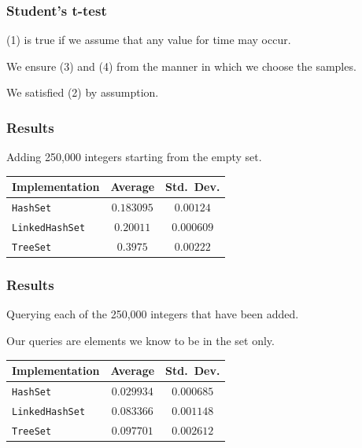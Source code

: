 \begin{frame}
\frametitle{Student's t-test}
\begin{changemargin}{1cm}

(1) is true if we assume that any value for time may
occur.

We ensure (3) and (4) from the manner in which we choose the samples. 

We satisfied (2) by assumption.
\end{changemargin}
\end{frame}

\begin{frame}
\frametitle{Results}
\begin{changemargin}{1cm}
Adding 250,000 integers starting from the empty set.

\begin{center}
    \begin{tabular}{l|c|c}
	\textbf{Implementation} & \textbf{Average} & \textbf{Std.~Dev.}\\ \hline
	\texttt{HashSet} & $0.183095$ & $0.00124$ \\ \hline
	\texttt{LinkedHashSet} & $0.20011$ & $0.000609$ \\ \hline
	\texttt{TreeSet} & $0.3975$ & $0.00222$ \\
    \end{tabular}
\end{center}

\end{changemargin}
\end{frame}

\begin{frame}
\frametitle{Results}
\begin{changemargin}{1cm}
Querying each of the 250,000 integers that have been added.

Our queries are elements we know to be in the set only.

\begin{center}
    \begin{tabular}{l|c|c}
	
	\textbf{Implementation} & \textbf{Average} & \textbf{Std.~Dev.}\\ \hline
	\texttt{HashSet} & $0.029934$ & $0.000685$ \\ \hline
	\texttt{LinkedHashSet} & $0.083366$ & $0.001148$ \\ \hline
	\texttt{TreeSet} & $0.097701$ & $0.002612$ \\
    \end{tabular}
\end{center}

\end{changemargin}
\end{frame}

